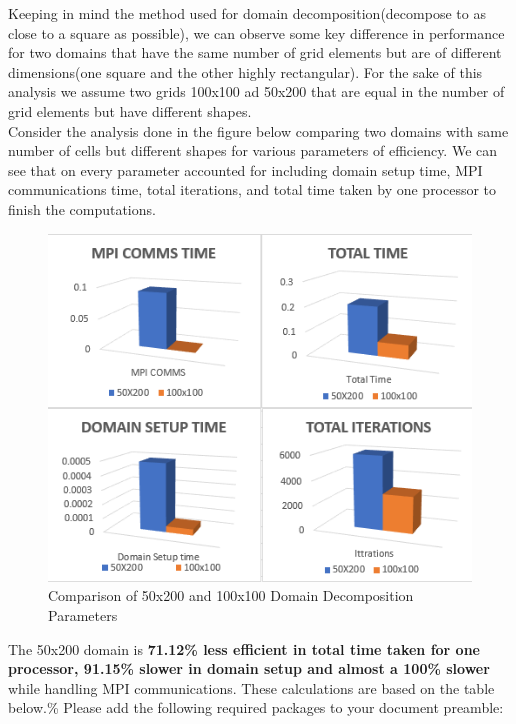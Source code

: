 \documentclass[twoside,twocolumn]{article}
\begin{document}
\vspace{-4mm}
Keeping in mind the method used for domain decomposition(decompose to as close to a square as possible), we can observe some key difference in performance for two domains that have the same number of grid elements but are of different dimensions(one square and the other highly rectangular). For the sake of this analysis we assume two grids 100x100 ad 50x200 that are equal in the number of grid elements but have different shapes.\\
Consider the analysis done in the figure below comparing two domains with same number of cells but different shapes for various parameters of efficiency. We can see that on every parameter accounted for including domain setup time, MPI communications time, total iterations, and total time taken by one processor to finish the computations.
\vspace{-4mm}
\begin{figure}[H]
\centering
\includegraphics[height=8.3 cm\textwidth]{images/domsizeanalysis.png}
\caption{Comparison of 50x200 and 100x100 Domain Decomposition Parameters}
\end{figure}
\vspace{-4mm}

The 50x200 domain is \textbf{71.12\% less efficient in total time taken for one processor, 91.15\% slower in domain setup and almost a 100\% slower} while handling MPI communications. These calculations are based on the table below.\% Please add the following required packages to your document preamble:
\end{document}
